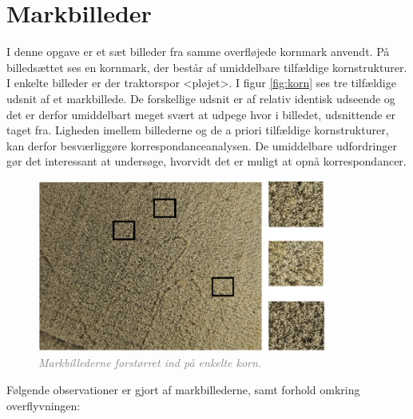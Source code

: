 \section{Markbilleder}
I denne opgave er et sæt billeder fra samme overfløjede kornmark anvendt. På billedsættet ses en kornmark, der består af umiddelbare tilfældige kornstrukturer. I enkelte billeder er der traktorspor <pløjet>. I figur \eqref{fig:korn} ses tre tilfældige udsnit af et markbillede. De forskellige udsnit er af relativ identisk udseende og det er derfor umiddelbart meget svært at udpege hvor i billedet, udsnittende er taget fra. Ligheden imellem billederne og de a priori tilfældige kornstrukturer, kan derfor besværliggøre korrespondanceanalysen. De umiddelbare udfordringer gør det interessant at undersøge, hvorvidt det er muligt at opnå korrespondancer.
\begin{figure}[H]
    \centering
    \includegraphics[width=0.85\textwidth]{fig/20a.png}
    \begin{center}    
       \caption{\textcolor{gray}{\footnotesize \textit{Markbillederne forstørret ind på enkelte korn.}}}
    \label{fig:korn}
     \end{center}
     \vspace{-2.5em}
  \end{figure} \noindent
Følgende observationer er gjort af markbillederne, samt forhold omkring overflyvningen:
